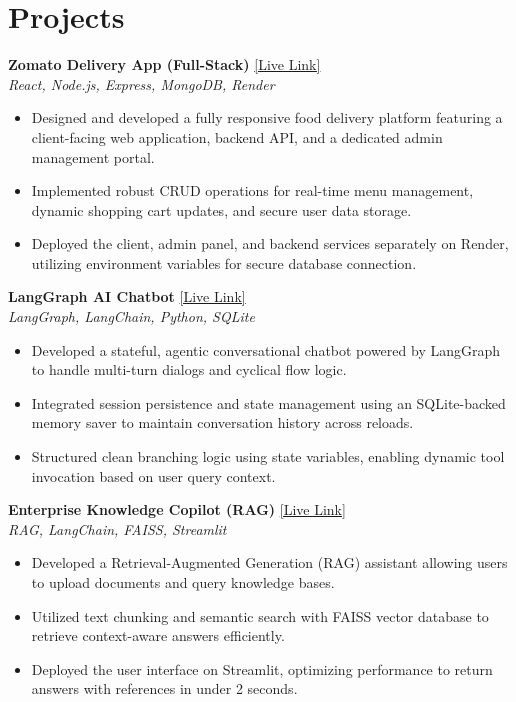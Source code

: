 \documentclass[10pt,letterpaper]{article}
\begin{document}
\section{Projects}

\noindent \textbf{Zomato Delivery App (Full-Stack)} \hfill \href{https://tomato-delivery-frontend-16al.onrender.com}{[Live Link]} \\
\textit{React, Node.js, Express, MongoDB, Render}
\begin{itemize}
    \item Designed and developed a fully responsive food delivery platform featuring a client-facing web application, backend API, and a dedicated admin management portal.
    \item Implemented robust CRUD operations for real-time menu management, dynamic shopping cart updates, and secure user data storage.
    \item Deployed the client, admin panel, and backend services separately on Render, utilizing environment variables for secure database connection.
\end{itemize}

\noindent \textbf{LangGraph AI Chatbot} \hfill \href{https://chatbot-cqhq4vpuraen6vxo4g4nt4.streamlit.app/}{[Live Link]} \\
\textit{LangGraph, LangChain, Python, SQLite}
\begin{itemize}
    \item Developed a stateful, agentic conversational chatbot powered by LangGraph to handle multi-turn dialogs and cyclical flow logic.
    \item Integrated session persistence and state management using an SQLite-backed memory saver to maintain conversation history across reloads.
    \item Structured clean branching logic using state variables, enabling dynamic tool invocation based on user query context.
\end{itemize}

\noindent \textbf{Enterprise Knowledge Copilot (RAG)} \hfill \href{https://chatbot-cqhq4vpuraen6vxo4g4nt4.streamlit.app/}{[Live Link]} \\
\textit{RAG, LangChain, FAISS, Streamlit}
\begin{itemize}
    \item Developed a Retrieval-Augmented Generation (RAG) assistant allowing users to upload documents and query knowledge bases.
    \item Utilized text chunking and semantic search with FAISS vector database to retrieve context-aware answers efficiently.
    \item Deployed the user interface on Streamlit, optimizing performance to return answers with references in under 2 seconds.
\end{itemize}
\end{document}
